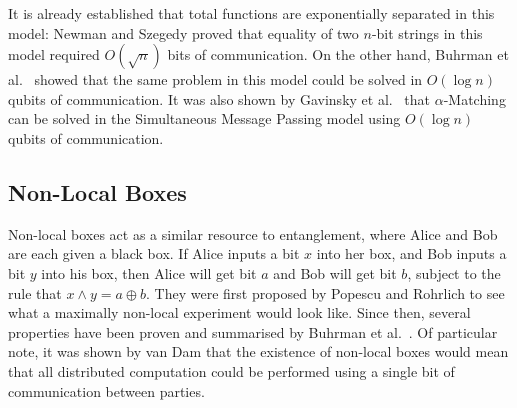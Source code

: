\documentclass[a4paper]{article}
\begin{document}
\begin{appendices}
        It is already established that total functions are exponentially separated in this model: Newman and Szegedy \cite{Newman:1996:PVP:237814.238004} proved that equality of two $n$-bit strings in this model required $O(\sqrt{n})$ bits of communication. On the other hand, Buhrman et al.~\cite{PhysRevLett.87.167902} showed that the same problem in this model could be solved in $O(\log n)$ qubits of communication. It was also shown by Gavinsky et al.~\cite{Gavinsky:2007:ESO:1250790.1250866} that $\alpha$-Matching can be solved in the Simultaneous Message Passing model using $O(\log n)$ qubits of communication.

        \subsection{Non-Local Boxes}

        Non-local boxes act as a similar resource to entanglement, where Alice and Bob are each given a black box. If Alice inputs a bit $x$ into her box, and Bob inputs a bit $y$ into his box, then Alice will get bit $a$ and Bob will get bit $b$, subject to the rule that $x \wedge y = a \oplus b$. They were first proposed by Popescu and Rohrlich \cite{10.1007/BF02058098} to see what a maximally non-local experiment would look like. Since then, several properties have been proven and summarised by Buhrman et al.~\cite{RevModPhys.82.665}. Of particular note, it was shown by van Dam \cite{Dam2012} that the existence of non-local boxes would mean that all distributed computation could be performed using a single bit of communication between parties.

        \end{appendices}
\end{document}
